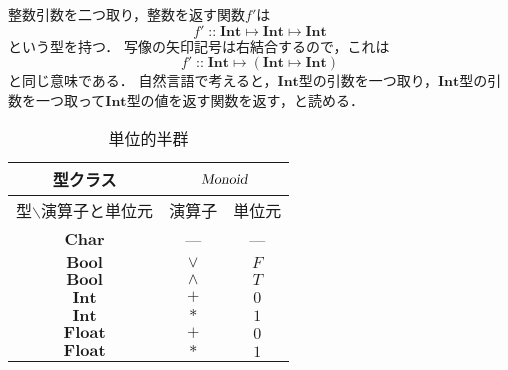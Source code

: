 \documentclass[twocolumn]{jsbook}
\newcommand{\hsklType}[1]{\textbf{#1}}
\newcommand{\hsklTypeclass}[1]{\textsl{#1}}
\newcommand{\hsklBool}{\hsklType{Bool}}
\newcommand{\hsklChar}{\hsklType{Char}}
\newcommand{\hsklInt}{\hsklType{Int}}
\newcommand{\hsklFloat}{\hsklType{Float}}
\newcommand{\hsklMonoid}{\hsklTypeclass{Monoid}}
\DeclareMathOperator{\mathIn}{::}
\DeclareMathOperator{\mathMapsTo}{\mapsto}
\newcommand{\mathMorphII}[3]{#1\mathMapsTo#2\mathMapsTo#3}
\newcommand{\mathMorphIIWithParenthesis}[3]{#1\mathMapsTo(#2\mathMapsTo#3)}
\begin{document}
整数引数を二つ取り，整数を返す関数$f'$は$$f'\mathIn\mathMorphII{\hsklInt}{\hsklInt}{\hsklInt}$$という型を持つ．
写像の矢印記号は右結合するので，これは$$f'\mathIn\mathMorphIIWithParenthesis{\hsklInt}{\hsklInt}{\hsklInt}$$と同じ意味である．
自然言語で考えると，$\hsklInt$型の引数を一つ取り，$\hsklInt$型の引数を一つ取って$\hsklInt$型の値を返す関数を返す，と読める．

\begin{table}
\caption{単位的半群}
\label{tab:monoids}
\begin{center}
\begin{tabular}{||c||c|c||}
\hline
型クラス
    &\multicolumn{2}{|c||}{$\hsklMonoid$}\\
\hline\hline
型$\backslash$演算子と単位元
    &演算子
    &単位元\\
\hline
$\hsklChar$
    &---
    &---\\
\hline
$\hsklBool$
    &$\vee$
    &$F$\\
\hline
$\hsklBool$
    &$\wedge$
    &$T$\\
\hline
$\hsklInt$
    &$+$
    &$0$\\
\hline
$\hsklInt$
    &$*$
    &$1$\\
\hline
$\hsklFloat$
    &$+$
    &$0$\\
\hline
$\hsklFloat$
    &$*$
    &$1$\\
\hline
\end{tabular}
\end{center}
\end{table}
\end{document}
